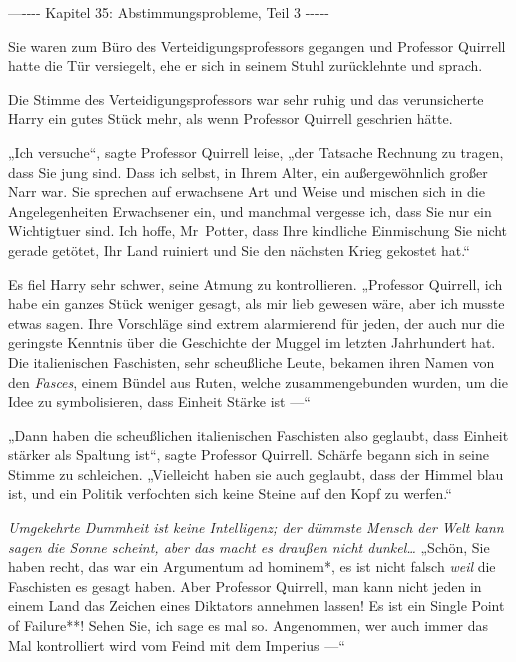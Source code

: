 

\hypertarget{abstimmungsprobleme-teil-3}{%

—\/-\/-\/-\/- Kapitel 35: Abstimmungsprobleme, Teil 3 -\/-\/-\/-\/-

Sie waren zum Büro des Verteidigungsprofessors gegangen und Professor Quirrell hatte die Tür versiegelt, ehe er sich in seinem Stuhl zurücklehnte und sprach.

Die Stimme des Verteidigungsprofessors war sehr ruhig und das verunsicherte Harry ein gutes Stück mehr, als wenn Professor Quirrell geschrien hätte.

„Ich versuche“, sagte Professor Quirrell leise, „der Tatsache Rechnung zu tragen, dass Sie jung sind. Dass ich selbst, in Ihrem Alter, ein außergewöhnlich großer Narr war. Sie sprechen auf erwachsene Art und Weise und mischen sich in die Angelegenheiten Erwachsener ein, und manchmal vergesse ich, dass Sie nur ein Wichtigtuer sind. Ich hoffe, Mr~Potter, dass Ihre kindliche Einmischung Sie nicht gerade getötet, Ihr Land ruiniert und Sie den nächsten Krieg gekostet hat.“

Es fiel Harry sehr schwer, seine Atmung zu kontrollieren. „Professor Quirrell, ich habe ein ganzes Stück weniger gesagt, als mir lieb gewesen wäre, aber ich musste etwas sagen. Ihre Vorschläge sind extrem alarmierend für jeden, der auch nur die geringste Kenntnis über die Geschichte der Muggel im letzten Jahrhundert hat. Die italienischen Faschisten, sehr scheußliche Leute, bekamen ihren Namen von den \emph{Fasces}, einem Bündel aus Ruten, welche zusammengebunden wurden, um die Idee zu symbolisieren, dass Einheit Stärke ist —“

„Dann haben die scheußlichen italienischen Faschisten also geglaubt, dass Einheit stärker als Spaltung ist“, sagte Professor Quirrell. Schärfe begann sich in seine Stimme zu schleichen. „Vielleicht haben sie auch geglaubt, dass der Himmel blau ist, und ein Politik verfochten sich keine Steine auf den Kopf zu werfen.“

\emph{Umgekehrte Dummheit ist keine Intelligenz; der dümmste Mensch der Welt kann sagen die Sonne scheint, aber das macht es draußen nicht dunkel…} „Schön, Sie haben recht, das war ein Argumentum ad hominem*, es ist nicht falsch \emph{weil} die Faschisten es gesagt haben. Aber Professor Quirrell, man kann nicht jeden in einem Land das Zeichen eines Diktators annehmen lassen! Es ist ein Single Point of Failure**! Sehen Sie, ich sage es mal so. Angenommen, wer auch immer das Mal kontrolliert wird vom Feind mit dem Imperius —“

}
